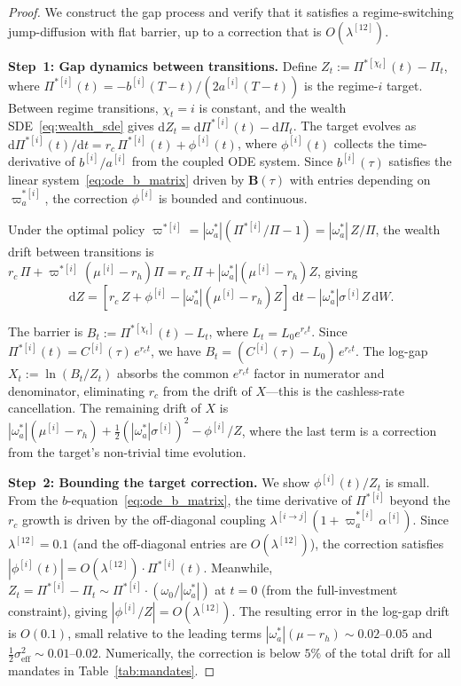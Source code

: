 \documentclass[11pt,a4paper]{article}
\numberwithin{equation}{section}
\newcommand{\dd}{\mathrm{d}}
\begin{document}
\begin{appendices}
\begin{proof}
We construct the gap process and verify that it satisfies a regime-switching jump-diffusion with flat barrier, up to a correction that is $O(\lambda^{[12]})$.

\medskip\noindent\textbf{Step~1: Gap dynamics between transitions.}
Define $Z_t := \Pi^{*[\chi_t]}(t) - \Pi_t$, where $\Pi^{*[i]}(t) = -b^{[i]}(T-t)/(2a^{[i]}(T-t))$ is the regime-$i$ target.  Between regime transitions, $\chi_t = i$ is constant, and the wealth SDE~\eqref{eq:wealth_sde} gives $\dd Z_t = \dd \Pi^{*[i]}(t) - \dd \Pi_t$.  The target evolves as $\dd\Pi^{*[i]}(t)/\dd t = r_c\,\Pi^{*[i]}(t) + \phi^{[i]}(t)$, where $\phi^{[i]}(t)$ collects the time-derivative of $b^{[i]}/a^{[i]}$ from the coupled ODE system.  Since $b^{[i]}(\tau)$ satisfies the linear system~\eqref{eq:ode_b_matrix} driven by $\mathbf{B}(\tau)$ with entries depending on $\varpi^{*[i]}_a$, the correction $\phi^{[i]}$ is bounded and continuous.

Under the optimal policy $\varpi^{*[i]} = |\omega^*_a|(\Pi^{*[i]}/\Pi - 1) = |\omega^*_a|\,Z/\Pi$, the wealth drift between transitions is $r_c\,\Pi + \varpi^{*[i]}(\mu^{[i]} - r_h)\Pi = r_c\,\Pi + |\omega^*_a|(\mu^{[i]} - r_h)Z$, giving
\begin{equation}\label{eq:dZ_clean}
\dd Z = [r_c\,Z + \phi^{[i]} - |\omega^*_a|(\mu^{[i]} - r_h)Z]\,\dd t - |\omega^*_a|\sigma^{[i]}Z\,\dd W.
\end{equation}

The barrier is $B_t := \Pi^{*[\chi_t]}(t) - L_t$, where $L_t = L_0 e^{r_c t}$.  Since $\Pi^{*[i]}(t) = C^{[i]}(\tau)\,e^{r_c t}$, we have $B_t = (C^{[i]}(\tau) - L_0)\,e^{r_c t}$.  The log-gap $X_t := \ln(B_t/Z_t)$ absorbs the common $e^{r_c t}$ factor in numerator and denominator, eliminating $r_c$ from the drift of $X$---this is the cashless-rate cancellation.  The remaining drift of $X$ is $|\omega^*_a|(\mu^{[i]} - r_h) + \tfrac{1}{2}(|\omega^*_a|\sigma^{[i]})^2 - \phi^{[i]}/Z$, where the last term is a correction from the target's non-trivial time evolution.

\medskip\noindent\textbf{Step~2: Bounding the target correction.}
We show $\phi^{[i]}(t)/Z_t$ is small.  From the $b$-equation~\eqref{eq:ode_b_matrix}, the time derivative of $\Pi^{*[i]}$ beyond the $r_c$ growth is driven by the off-diagonal coupling $\lambda^{[i\to j]}(1 + \varpi^{*[i]}_a \alpha^{[i]})$.  Since $\lambda^{[12]} = 0.1$ (and the off-diagonal entries are $O(\lambda^{[12]})$), the correction satisfies $|\phi^{[i]}(t)| = O(\lambda^{[12]}) \cdot \Pi^{*[i]}(t)$.  Meanwhile, $Z_t = \Pi^{*[i]} - \Pi_t \sim \Pi^{*[i]} \cdot (\omega_0/|\omega^*_a|)$ at $t = 0$ (from the full-investment constraint), giving $|\phi^{[i]}/Z| = O(\lambda^{[12]})$.  The resulting error in the log-gap drift is $O(0.1)$, small relative to the leading terms $|\omega^*_a|(\mu - r_h) \sim 0.02$--$0.05$ and $\tfrac{1}{2}\sigma^2_{\mathrm{eff}} \sim 0.01$--$0.02$.  Numerically, the correction is below $5\%$ of the total drift for all mandates in Table~\ref{tab:mandates}.


\end{proof}
\end{appendices}
\end{document}
